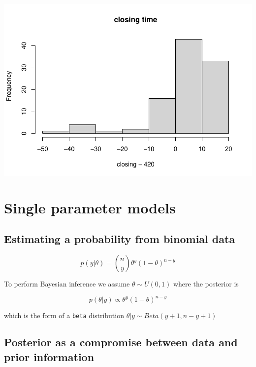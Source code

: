 \documentclass[
]{book}
\theoremstyle{definition}
\theoremstyle{definition}
\theoremstyle{definition}
\theoremstyle{definition}
\theoremstyle{remark}
\begin{document}
\includegraphics{_main_files/figure-latex/simul-4.pdf}

\hypertarget{cross}{%
\chapter{Single parameter models}\label{cross}}

\hypertarget{estimating-a-probability-from-binomial-data}{%
\section{Estimating a probability from binomial data}\label{estimating-a-probability-from-binomial-data}}

\begin{equation}
p(y  | \theta) = {n \choose y}\theta^y(1-\theta)^{n-y}
\label{eq:binomialProb}
\end{equation}

To perform Bayesian inference we assume \(\theta \sim U(0,1)\) where the posterior is

\begin{equation}
p(\theta | y) \propto \theta^y(1-\theta)^{n-y}
\label{eq:binomialPosterior}
\end{equation}

which is the form of a \texttt{beta} distribution \(\theta | y \sim Beta(y+1, n-y+1)\)

\hypertarget{posterior-as-a-compromise-between-data-and-prior-information}{%
\section{Posterior as a compromise between data and prior information}\label{posterior-as-a-compromise-between-data-and-prior-information}}
\end{document}
